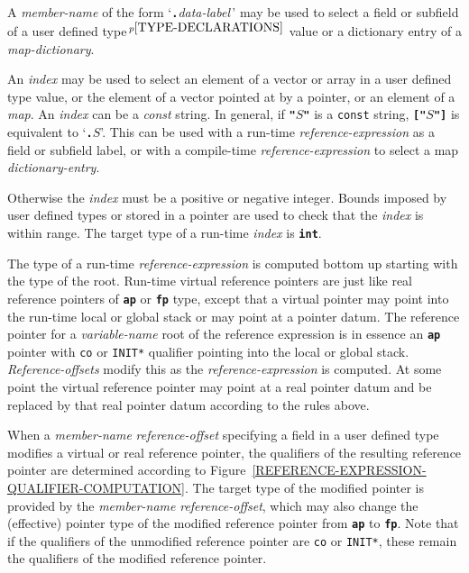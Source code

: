 \documentclass[12pt]{article}
\newcommand{\TT}[1]{{\tt \bfseries #1}}
\newcommand{\pagnote}[1]{$\,^{p\pageref{#1}}$}
\begin{document}
A {\em member-name} of the form `\TT{.}{\em data-label}\,'
may be used to select a field or subfield\label{FIELD-SELECTION}
of a user defined type\pagnote{TYPE-DECLARATIONS} value or
a dictionary entry of a {\em map-dictionary}.

An {\em index} may be used to select an element of a vector
or array in a
user defined type value, or the
element of a vector pointed at by a pointer, or an element
of a {\em map}.  An {\em index} can be a {\em const}
string.  In general, if \TT{"$S$"} is a {\tt const} string,
\TT{["$S$"]} is equivalent to `\TT{.$S$}'.  This can be used
with a run-time {\em reference-expression}
as a field or subfield label, or with a compile-time
{\em reference-expression} to select a map {\em dictionary-entry}.

Otherwise the
{\em index} must be a positive or negative integer.  Bounds imposed
by user defined types or stored in a pointer are used to
check that the {\em index} is within range.
The target type of a run-time {\em index} is \TT{int}.


The type of a run-time {\em reference-expression}
is computed bottom up starting with the type of the root.
Run-time virtual reference pointers are just like real reference
pointers of \TT{ap} or \TT{fp} type, except that a virtual pointer
may point into the run-time local or global
stack or may point at a pointer datum.  The reference pointer for
a {\em variable-name} root of the reference expression is in essence an \TT{ap}
pointer with {\tt co} or {\tt *INIT*} qualifier pointing into
the local or global stack.  {\em Reference-offsets} modify this as the
{\em reference-expression} is computed.  At some point the virtual
reference pointer may point at a real pointer datum and be replaced
by that real pointer datum according to the rules above.

When a {\em member-name} {\em reference-offset} specifying a field
in a user defined type modifies a
virtual or real reference pointer, the qualifiers of the resulting reference
pointer are determined according to 
Figure~\ref{REFERENCE-EXPRESSION-QUALIFIER-COMPUTATION}.%
\label{QUALIFIER-COMPUTATION}
The target type of the modified pointer is provided by the 
{\em member-name} {\em reference-offset}, which may also change the
(effective) pointer type of the modified reference pointer from
\TT{ap} to \TT{fp}.
Note that if the qualifiers of the unmodified reference pointer
are {\tt co} or {\tt *INIT*}, these remain the qualifiers of the
modified reference pointer.
\end{document}
